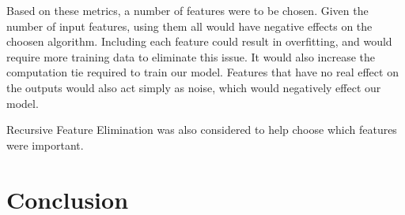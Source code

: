 \documentclass[12pt]{article}
\begin{document}
Based on these metrics, a number of features were to be chosen. Given the number of input features, using them all would have negative effects on the choosen algorithm. Including each feature could result in overfitting, and would require more training data to eliminate this issue. It would also increase the computation tie required to train our model. Features that have no real effect on the outputs would also act simply as noise, which would negatively effect our model.

Recursive Feature Elimination was also considered to help choose which features were important.

\part*{Conclusion}



\end{document}
